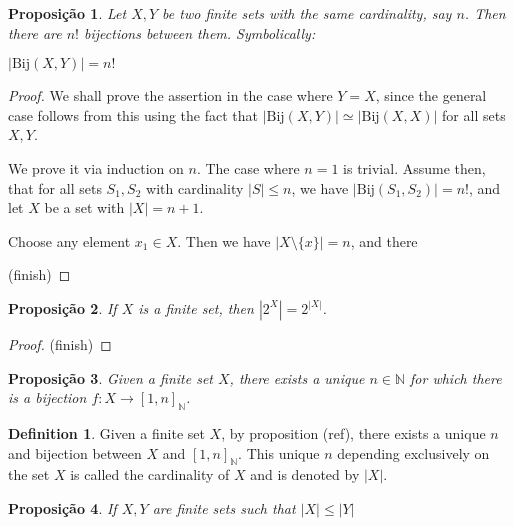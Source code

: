 \documentclass[]{article}
\newtheorem{proposition}{Proposição}[section]
\theoremstyle{definition}
\newtheorem{definition}{Definition}[section]
\theoremstyle{definition}
\newcommand{\raw}{\rightarrow}
\newcommand{\bb}{\mathbb}
\begin{document}
	\begin{proposition}
		Let $X, Y$ be two finite sets with the same cardinality, say $n$. Then there are $n!$ bijections between them. Symbolically:
		
		\begin{center}
			$|\text{Bij}(X, Y)| = n!$
		\end{center}
	\end{proposition}
	
	\begin{proof}
		We shall prove the assertion in the case where $Y=X$, since the general case follows from this using the fact that $|\text{Bij}(X, Y)| \simeq |\text{Bij}(X, X)|$ for all sets $X, Y$.
		
		We prove it via induction on $n$. The case where $n=1$ is trivial. Assume then, that for all sets $S_1, S_2$ with cardinality $|S| \leq n$, we have $|\text{Bij}(S_1, S_2)| = n!$, and let $X$ be a set with $|X|=n+1$.
		
		Choose any element $x_1 \in X$. Then we have $|X \setminus \{x \}|=n$, and there
		
		(finish)
	\end{proof}
	
	
	
	
	
	\begin{proposition}
		If $X$ is a finite set, then $|2^X| =2^{|X|}$.
	\end{proposition}
	
	\begin{proof}
		(finish)
	\end{proof}
	
	\begin{proposition}\label{uniquesetcardinality}
		Given a finite set $X$, there exists a unique $n \in \bb{N}$ for which there is a bijection $f:X \raw [1, n]_{\bb{N}}$.
	\end{proposition}
	
	\begin{definition}\label{cardinality}
		Given a finite set $X$, by proposition (ref), there exists a unique $n$ and bijection between $X$ and $[1, n]_{\bb{N}}$. This unique $n$ depending exclusively on the set $X$ is called the cardinality of $X$ and is denoted by $|X|$.
	\end{definition}
	
	\begin{proposition}
		If $X, Y$ are finite sets such that $|X| \leq |Y|$ 
	\end{proposition}
	
\end{document}
